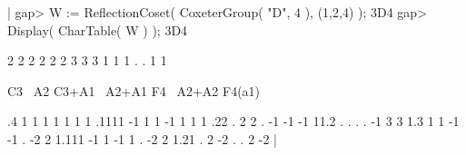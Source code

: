 |    gap> W := ReflectionCoset( CoxeterGroup( "D", 4 ), (1,2,4) );
    3D4
    gap> Display( CharTable( W ) );
    3D4

           2  2   2     2      2  2      3      3
           3  1   1     1      .  .      1      1

             C3 ~A2 C3+A1 ~A2+A1 F4 ~A2+A2 F4(a1)

    .4        1   1     1      1  1      1      1
    .1111    -1   1     1     -1  1      1      1
    .22       .   2     2      . -1     -1     -1
    11.2      .   .     .      . -1      3      3
    1.3       1   1    -1     -1  .     -2      2
    1.111    -1   1    -1      1  .     -2      2
    1.21      .   2    -2      .  .      2     -2
    |

